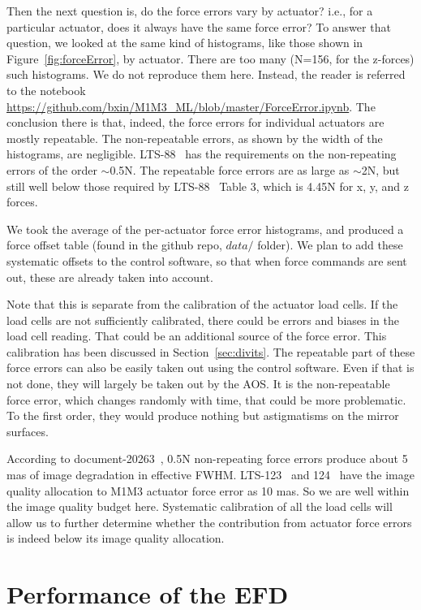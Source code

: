 \documentclass [twoside,openbib,12pt]{article}
\begin{document}
Then the next question is, do the force errors vary by actuator? i.e.,
for a particular actuator, does it always have the same force error?
To answer that question, we looked at the same kind of histograms,
like those shown in Figure~\ref{fig:forceError}, by actuator.
There are too many (N=156, for the z-forces) such histograms. We do not
reproduce them here. Instead, the reader is referred to the notebook
\url{https://github.com/bxin/M1M3_ML/blob/master/ForceError.ipynb}.
The conclusion there is that, indeed, the force errors for individual
actuators are mostly repeatable. The non-repeatable errors, as shown
by the width of the histograms, are negligible. LTS-88~\cite{lts88}
has the requirements on the
non-repeating errors of the order $\sim$0.5N.
The repeatable force errors are as large as $\sim$2N, but still
well below those required by LTS-88~\cite{lts88}  Table 3, which is 4.45N for x, y,
and z forces.

We took the average of the per-actuator force error histograms, and
produced a force offset table (found in the github repo, $data/$
folder). We plan to add these systematic offsets to the control
software, so that when force commands are sent out, these are already
taken into account.

Note that this is separate from the calibration of
the actuator load cells. If the load cells are not sufficiently calibrated,
there could be errors and biases in the load cell reading. That could
be an additional source of the force error.
This calibration has been discussed in Section~\ref{sec:divits}.
The repeatable part of these force errors can also be easily taken out
using the control software. Even if that is not done, they will
largely be taken out by the AOS.
It is the non-repeatable force error, which changes randomly with
time, that could be more problematic.
To the first order, they would produce nothing but astigmatisms on the mirror
surfaces.

According to document-20263~\cite{m1m3faccuracy}, 0.5N non-repeating force errors produce
about 5 mas of image degradation in effective FWHM.
LTS-123~\cite{lts123} and 124~\cite{lts124} have the image quality allocation to M1M3 actuator
force error as 10 mas. So we are well within the image quality budget
here.
Systematic calibration of all the load cells will allow us to further
determine whether the contribution from actuator force errors is
indeed below its image quality allocation.

\section{Performance of the EFD}
\label{sec:efd}
\end{document}
